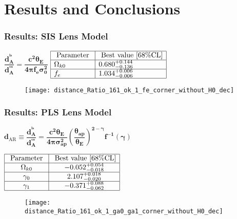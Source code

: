 \documentclass[10pt,xcolor={dvipsnames}]{beamer}
\begin{document}
\section{ Results and Conclusions}
\begin{frame}
 \frametitle{Results: \textbf{SIS} Lens Model}
 $
{\boxed{\boldsymbol{\dfrac{d_A^{^{ls}}}{d_A^{^{os}}}=\dfrac{c^2\theta_E}{4\pi f_e\sigma_{{0}}^2}}}}
$ \hspace*{2cm}$\begin{array}
 {|l|l|l|}\hline 
 \text { Parameter } & {\text { Best value }[68 \% \mathrm{CL}]} \\ \hline 
 \Omega_{k0} & {0.680^{+0.144}_{-0.136}} \\ \hline f_{e} & {1.034^{+0.006}_{-0.006}} \\ \hline
 \end{array}$
 \begin{figure}[ht!]
\centering
\texttt{[image: distance\_Ratio\_161\_ok\_1\_fe\_corner\_without\_H0\_dec]}
\end{figure} 
 \end{frame}
 \begin{frame}
 \frametitle{Results: \textbf{PLS} Lens Model}
\begin{scriptsize}
  $
{\boxed{\boldsymbol{d_{\mathrm{AR}}\equiv\dfrac{d_{A}^{^{l s}}}{d_{A}^{^{o s}}}=\dfrac{c^{2} \theta_{E}}{4 \pi \sigma_{ap}^{2}}\left(\dfrac{\theta_{a p}}{\theta_{E}}\right)^{2-\gamma} f^{-1}(\gamma)}}}
$
 \end{scriptsize}
 {\footnotesize $\begin{array}{|c|c|}\hline \text { Parameter } & {\text { Best value }[68 \% \mathrm{CL}]} \\ \hline \Omega_{k 0} & {-0.052^{+0.054}_{-0.018}} \\ \hline \gamma_{0} & {2.107_{-0.020}^{+0.018}} \\ \hline \gamma_{1} & {-0.371_{-0.062}^{+0.088}} \\ \hline\end{array}$}
  \begin{figure}[ht!]
\centering
\texttt{[image: distance\_Ratio\_161\_ok\_1\_ga0\_ga1\_corner\_without\_H0\_dec]}
\end{figure} 
\end{frame}
\end{document}
